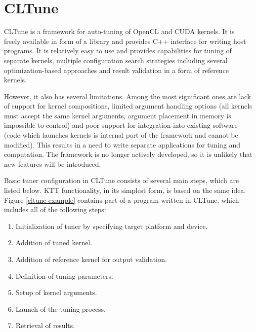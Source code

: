 \documentclass
[
    digital, %
    oneside, %
    table, %
    nolof, %
    nolot, %
    nocover %
]{fithesis3}
\begin{document}
\section{CLTune}
CLTune \cite{cltune} is a framework for auto-tuning of OpenCL and CUDA kernels. It is freely available in form of a library and provides C++ interface
for writing host programs. It is relatively easy to use and provides capabilities for tuning of separate kernels, multiple configuration search
strategies including several optimization-based approaches and result validation in a form of reference kernels.

However, it also has several limitations. Among the most significant ones are lack of support for kernel compositions, limited argument handling
options (all kernels must accept the same kernel arguments, argument placement in memory is impossible to control) and poor support for integration into
existing software (code which launches kernels is internal part of the framework and cannot be modified). This results in a need to write separate
applications for tuning and computation. The framework is no longer actively developed, so it is unlikely that new features will be introduced.

Basic tuner configuration in CLTune consists of several main steps, which are listed below. KTT functionality, in its simplest form, is based on the
same idea. Figure \ref{cltune-example} contains part of a program written in CLTune, which includes all of the following steps:
\begin{enumerate}
    \item Initialization of tuner by specifying target platform and device.
    \item Addition of tuned kernel.
    \item Addition of reference kernel for output validation.
    \item Definition of tuning parameters.
    \item Setup of kernel arguments.
    \item Launch of the tuning process.
    \item Retrieval of results.
\end{enumerate}
\end{document}

